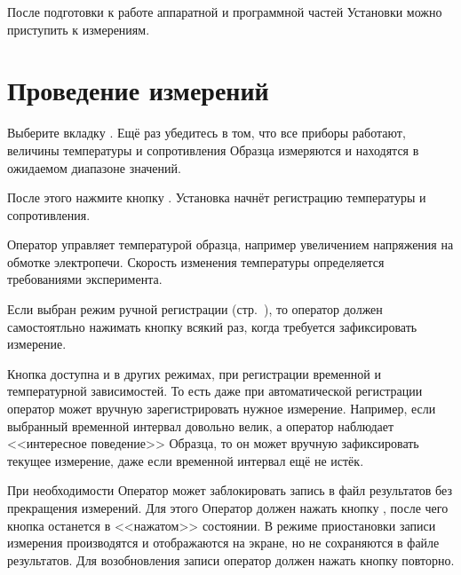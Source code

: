 \documentclass[12pt, a4paper, twocolumn]{report}
\begin{document}
После подготовки к работе аппаратной и программной частей Установки можно приступить к измерениям.

\section{Проведение измерений}

Выберите вкладку . Ещё раз убедитесь в том, что все приборы работают, величины температуры и сопротивления Образца измеряются и находятся в ожидаемом диапазоне значений.

После этого нажмите кнопку . Установка начнёт регистрацию температуры и сопротивления.

Оператор управляет температурой образца, например увеличением напряжения на обмотке электропечи. Скорость изменения температуры определяется требованиями эксперимента.

Если выбран режим ручной регистрации (стр.~\pageref{sec_reg_type_manual}), то оператор должен самостоятльно нажимать кнопку \label{sec_manual} всякий раз, когда требуется зафиксировать измерение.

Кнопка  доступна и в других режимах, при регистрации временной и температурной зависимостей. То есть даже при автоматической регистрации оператор может вручную зарегистрировать нужное измерение. Например, если выбранный временной интервал довольно велик, а оператор наблюдает <<интересное поведение>> Образца, то он может вручную зафиксировать текущее измерение, даже если временной интервал ещё не истёк.

При необходимости Оператор может заблокировать запись в файл результатов без прекращения измерений. Для этого Оператор должен нажать кнопку , после чего кнопка останется в <<нажатом>> состоянии. В режиме приостановки записи измерения производятся и отображаются на экране, но не сохраняются в файле результатов. Для возобновления записи оператор должен нажать кнопку повторно.

\end{document}
